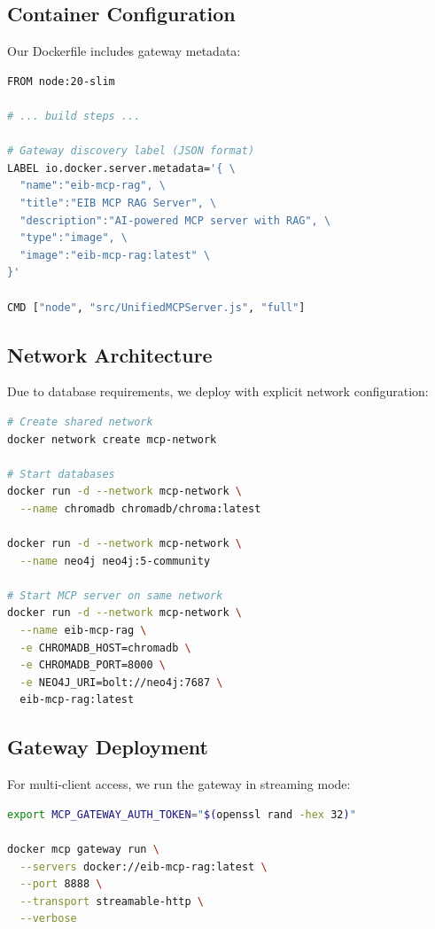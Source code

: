 \documentclass[11pt,letterpaper]{article}
\begin{document}
\subsection{Container Configuration}

Our Dockerfile includes gateway metadata:

\begin{lstlisting}[language=bash,caption={Dockerfile with Gateway Support}]
FROM node:20-slim

# ... build steps ...

# Gateway discovery label (JSON format)
LABEL io.docker.server.metadata='{ \
  "name":"eib-mcp-rag", \
  "title":"EIB MCP RAG Server", \
  "description":"AI-powered MCP server with RAG", \
  "type":"image", \
  "image":"eib-mcp-rag:latest" \
}'

CMD ["node", "src/UnifiedMCPServer.js", "full"]
\end{lstlisting}

\subsection{Network Architecture}

Due to database requirements, we deploy with explicit network configuration:

\begin{lstlisting}[language=bash,caption={Production Container Deployment}]
# Create shared network
docker network create mcp-network

# Start databases
docker run -d --network mcp-network \
  --name chromadb chromadb/chroma:latest

docker run -d --network mcp-network \
  --name neo4j neo4j:5-community

# Start MCP server on same network
docker run -d --network mcp-network \
  --name eib-mcp-rag \
  -e CHROMADB_HOST=chromadb \
  -e CHROMADB_PORT=8000 \
  -e NEO4J_URI=bolt://neo4j:7687 \
  eib-mcp-rag:latest
\end{lstlisting}

\subsection{Gateway Deployment}

For multi-client access, we run the gateway in streaming mode:

\begin{lstlisting}[language=bash,caption={Gateway Startup}]
export MCP_GATEWAY_AUTH_TOKEN="$(openssl rand -hex 32)"

docker mcp gateway run \
  --servers docker://eib-mcp-rag:latest \
  --port 8888 \
  --transport streamable-http \
  --verbose
\end{lstlisting}
\end{document}
